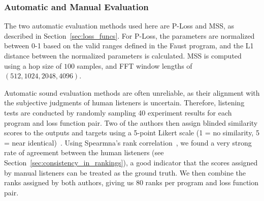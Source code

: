 \documentclass[lettersize,journal]{IEEEtran}
\newcommand{\BPNoise}{\textbf{BP-Noise}}
\newcommand{\AddSineSaw}{\textbf{Add-SineSaw}}
\newcommand{\AmpMod}{\textbf{Noise-AM}}
\newcommand{\FMMod}{\textbf{SineSaw-AM}}
\begin{document}
\subsubsection{Automatic and Manual Evaluation}
\label{sec:evaluation_manual_auto}
The two automatic evaluation methods used here are P-Loss and MSS, as described in Section~\ref{sec:loss_funcs}. For P-Loss, the parameters are normalized between 0-1 based on the valid ranges defined in the Faust program, and the L1 distance between the normalized parameters is calculated. MSS is computed using a hop size of $100$ samples, and FFT window lengths of $(512, 1024, 2048, 4096)$. 

Automatic sound evaluation methods are often unreliable, as their alignment with the subjective judgments of human listeners is uncertain. Therefore, listening tests are conducted by randomly sampling 40 experiment results for each program and loss function pair. Two of the authors then assign blinded similarity scores to the outputs and targets using a 5-point Likert scale (1 = no similarity, 5 = near identical)~\cite{jebb2021review}. Using Spearmna's rank correlation~\cite{spearman1987proof,rebekic2015pearson}, we found a very strong rate of agreement between the human listeners (see Section~\ref{sec:consistency_in_rankings}), a good indicator that the scores assigned by manual listeners can be treated as the ground truth. We then combine the ranks assigned by both authors, giving us 80 ranks per program and loss function pair. 



\end{document}
